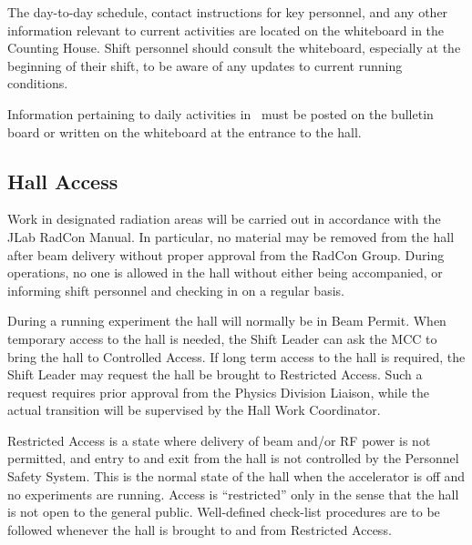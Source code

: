 \documentclass[11pt]{article}
\begin{document}
The day-to-day schedule, contact instructions for key personnel, and 
any other information relevant to current activities are located
on the whiteboard in the Counting House. Shift personnel should
consult the whiteboard, especially at the beginning
of their shift, to be aware of any updates to current running conditions.

Information pertaining to daily activities in \HALL\ must be posted on the 
bulletin board or written on the whiteboard at the entrance to the hall.

\subsection{Hall Access}
\indent

Work in designated radiation 
areas will be carried out in accordance
with the JLab RadCon Manual. In particular, no material 
may be removed from the hall after beam delivery
without proper approval from
the RadCon Group.
During operations, no one is allowed in the hall 
without either being accompanied, or informing shift personnel
and checking in on a regular basis. 
 
During a running experiment the hall will normally be in Beam Permit. When 
temporary access to the hall is needed, the Shift Leader can ask the MCC to 
bring the hall to Controlled Access. If long term access to the hall is
required, the Shift Leader may request the hall be brought to Restricted
Access. Such a request requires prior approval from the Physics Division
Liaison, while the actual transition will be supervised by the Hall Work
Coordinator.

Restricted Access is a state where  delivery of beam and/or RF power is not 
permitted, and entry to and exit 
from the hall is not controlled by the Personnel Safety System. This is the 
normal state of the hall when the accelerator is off and no experiments are 
running. Access is ``restricted'' only in the sense that the hall is not open 
to the general public. Well-defined check-list procedures are to
be followed whenever the hall is brought to and from Restricted Access.
\end{document}
